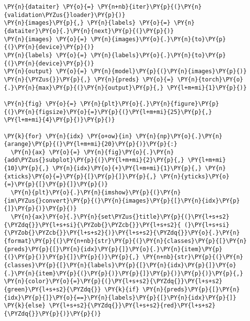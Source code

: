     \begin{tcolorbox}[breakable, size=fbox, boxrule=1pt, pad at break*=1mm,colback=cellbackground, colframe=cellborder]
\begin{Verbatim}[commandchars=\\\{\}]
\PY{n}{dataiter} \PY{o}{=} \PY{n+nb}{iter}\PY{p}{(}\PY{n}{validation\PYZus{}loader}\PY{p}{)}
\PY{n}{images}\PY{p}{,} \PY{n}{labels} \PY{o}{=} \PY{n}{dataiter}\PY{o}{.}\PY{n}{next}\PY{p}{(}\PY{p}{)}
\PY{n}{images} \PY{o}{=} \PY{n}{images}\PY{o}{.}\PY{n}{to}\PY{p}{(}\PY{n}{device}\PY{p}{)}
\PY{n}{labels} \PY{o}{=} \PY{n}{labels}\PY{o}{.}\PY{n}{to}\PY{p}{(}\PY{n}{device}\PY{p}{)}
\PY{n}{output} \PY{o}{=} \PY{n}{model}\PY{p}{(}\PY{n}{images}\PY{p}{)}
\PY{n}{\PYZus{}}\PY{p}{,} \PY{n}{preds} \PY{o}{=} \PY{n}{torch}\PY{o}{.}\PY{n}{max}\PY{p}{(}\PY{n}{output}\PY{p}{,} \PY{l+m+mi}{1}\PY{p}{)}

\PY{n}{fig} \PY{o}{=} \PY{n}{plt}\PY{o}{.}\PY{n}{figure}\PY{p}{(}\PY{n}{figsize}\PY{o}{=}\PY{p}{(}\PY{l+m+mi}{25}\PY{p}{,} \PY{l+m+mi}{4}\PY{p}{)}\PY{p}{)}

\PY{k}{for} \PY{n}{idx} \PY{o+ow}{in} \PY{n}{np}\PY{o}{.}\PY{n}{arange}\PY{p}{(}\PY{l+m+mi}{20}\PY{p}{)}\PY{p}{:}
  \PY{n}{ax} \PY{o}{=} \PY{n}{fig}\PY{o}{.}\PY{n}{add\PYZus{}subplot}\PY{p}{(}\PY{l+m+mi}{2}\PY{p}{,} \PY{l+m+mi}{10}\PY{p}{,} \PY{n}{idx}\PY{o}{+}\PY{l+m+mi}{1}\PY{p}{,} \PY{n}{xticks}\PY{o}{=}\PY{p}{[}\PY{p}{]}\PY{p}{,} \PY{n}{yticks}\PY{o}{=}\PY{p}{[}\PY{p}{]}\PY{p}{)}
  \PY{n}{plt}\PY{o}{.}\PY{n}{imshow}\PY{p}{(}\PY{n}{im\PYZus{}convert}\PY{p}{(}\PY{n}{images}\PY{p}{[}\PY{n}{idx}\PY{p}{]}\PY{p}{)}\PY{p}{)}
  \PY{n}{ax}\PY{o}{.}\PY{n}{set\PYZus{}title}\PY{p}{(}\PY{l+s+s2}{\PYZdq{}}\PY{l+s+si}{\PYZob{}\PYZcb{}}\PY{l+s+s2}{ (}\PY{l+s+si}{\PYZob{}\PYZcb{}}\PY{l+s+s2}{)}\PY{l+s+s2}{\PYZdq{}}\PY{o}{.}\PY{n}{format}\PY{p}{(}\PY{n+nb}{str}\PY{p}{(}\PY{n}{classes}\PY{p}{[}\PY{n}{preds}\PY{p}{[}\PY{n}{idx}\PY{p}{]}\PY{o}{.}\PY{n}{item}\PY{p}{(}\PY{p}{)}\PY{p}{]}\PY{p}{)}\PY{p}{,} \PY{n+nb}{str}\PY{p}{(}\PY{n}{classes}\PY{p}{[}\PY{n}{labels}\PY{p}{[}\PY{n}{idx}\PY{p}{]}\PY{o}{.}\PY{n}{item}\PY{p}{(}\PY{p}{)}\PY{p}{]}\PY{p}{)}\PY{p}{)}\PY{p}{,} \PY{n}{color}\PY{o}{=}\PY{p}{(}\PY{l+s+s2}{\PYZdq{}}\PY{l+s+s2}{green}\PY{l+s+s2}{\PYZdq{}} \PY{k}{if} \PY{n}{preds}\PY{p}{[}\PY{n}{idx}\PY{p}{]}\PY{o}{==}\PY{n}{labels}\PY{p}{[}\PY{n}{idx}\PY{p}{]} \PY{k}{else} \PY{l+s+s2}{\PYZdq{}}\PY{l+s+s2}{red}\PY{l+s+s2}{\PYZdq{}}\PY{p}{)}\PY{p}{)}
\end{Verbatim}
\end{tcolorbox}

    \begin{center}
    \end{center}
    { \hspace*{\fill} \\}

